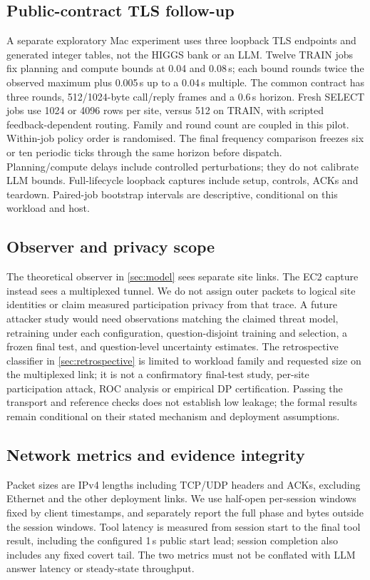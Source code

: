 \subsection{Public-contract TLS follow-up}\label{sec:localcontractmethod}
A separate exploratory Mac experiment uses three loopback TLS endpoints and generated integer tables, not the HIGGS bank or an LLM. Twelve TRAIN jobs fix planning and compute bounds at 0.04 and 0.08\,s; each bound rounds twice the observed maximum plus 0.005\,s up to a 0.04\,s multiple. The common contract has three rounds, 512/1024-byte call/reply frames and a 0.6\,s horizon. Fresh SELECT jobs use 1024 or 4096 rows per site, versus 512 on TRAIN, with scripted feedback-dependent routing. Family and round count are coupled in this pilot. Within-job policy order is randomised. The final frequency comparison freezes six or ten periodic ticks through the same horizon before dispatch. Planning/compute delays include controlled perturbations; they do not calibrate LLM bounds. Full-lifecycle loopback captures include setup, controls, ACKs and teardown. Paired-job bootstrap intervals are descriptive, conditional on this workload and host.

\subsection{Observer and privacy scope}\label{sec:attack}
The theoretical observer in \cref{sec:model} sees separate site links. The EC2 capture instead sees a multiplexed tunnel. We do not assign outer packets to logical site identities or claim measured participation privacy from that trace. A future attacker study would need observations matching the claimed threat model, retraining under each configuration, question-disjoint training and selection, a frozen final test, and question-level uncertainty estimates. The retrospective classifier in \cref{sec:retrospective} is limited to workload family and requested size on the multiplexed link; it is not a confirmatory final-test study, per-site participation attack, ROC analysis or empirical DP certification. Passing the transport and reference checks does not establish low leakage; the formal results remain conditional on their stated mechanism and deployment assumptions.

\subsection{Network metrics and evidence integrity}
Packet sizes are IPv4 lengths including TCP/UDP headers and ACKs, excluding Ethernet and the other deployment links. We use half-open per-session windows fixed by client timestamps, and separately report the full phase and bytes outside the session windows. Tool latency is measured from session start to the final tool result, including the configured 1\,s public start lead; session completion also includes any fixed covert tail. The two metrics must not be conflated with LLM answer latency or steady-state throughput.


